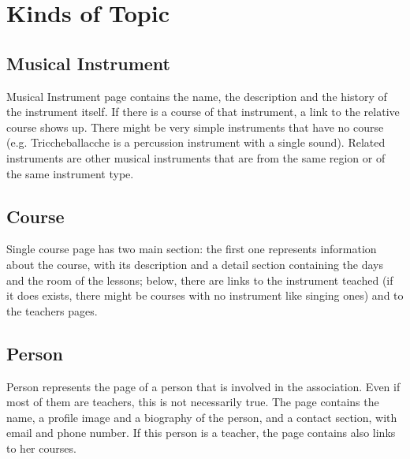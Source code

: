 \documentclass[../../DD.tex]{subfiles}
\begin{document}
\section{Kinds of Topic \label{sect:2.1}}
	\subsection{Musical Instrument}
		Musical Instrument page contains the name, the description and the history of the instrument itself. If there is a course of that instrument, a link to the relative course shows up. There might be very simple instruments that have no course (e.g. Triccheballacche is a percussion instrument with a single sound). Related instruments are other musical instruments that are from the same region or of the same instrument type.
		\newline

	\subsection{Course}
		Single course page has two main section: the first one represents information about the course, with its description and a detail section containing the days and the room of the lessons; below, there are links to the instrument teached (if it does exists, there might be courses with no instrument like singing ones) and to the teachers pages.  
		\newline

	\subsection{Person}
		Person represents the page of a person that is involved in the association. Even if most of them are teachers, this is not necessarily true. The page contains the name, a profile image and a biography of the person, and a contact section, with email and phone number. If this person is a teacher, the page contains also links to her courses.
		\newline
\end{document}
